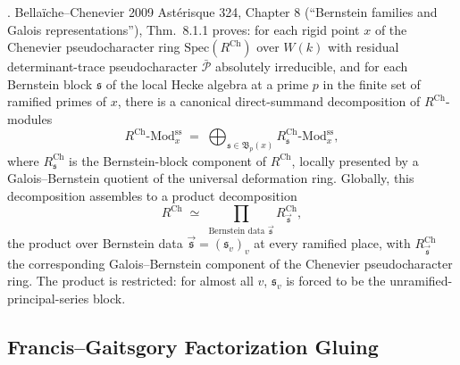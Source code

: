 \begin{theorem}
\label{v4-arith:w6-g:thm:bc-bernstein-galois}
\ClaimStatusProvedElsewhere. Bella\"iche--Chenevier 2009 Ast\'erisque
324, Chapter 8 (``Bernstein families and Galois
representations''), Thm.~8.1.1 proves: for each rigid point \(x\) of
the Chenevier pseudocharacter ring
\(\mathrm{Spec}(R^{\mathrm{Ch}})\) over \(W(k)\) with residual
determinant-trace pseudocharacter \(\bar{\mathcal{P}}\) absolutely
irreducible, and for each Bernstein block \(\mathfrak{s}\) of the
local Hecke algebra at a prime \(p\) in the finite set of ramified
primes of \(x\), there is a canonical direct-summand decomposition of
\(R^{\mathrm{Ch}}\)-modules
\begin{equation}
\label{v4-arith:w6-g:eq:bc-bernstein-galois}
R^{\mathrm{Ch}}\text{-}\mathrm{Mod}^{\mathrm{ss}}_{x}\;=\;\bigoplus_{\mathfrak{s}\in\mathfrak{B}_{p}(x)}R^{\mathrm{Ch}}_{\mathfrak{s}}\text{-}\mathrm{Mod}^{\mathrm{ss}}_{x},
\end{equation}
where \(R^{\mathrm{Ch}}_{\mathfrak{s}}\) is the Bernstein-block
component of \(R^{\mathrm{Ch}}\), locally presented by a
Galois--Bernstein quotient of the universal deformation ring.
Globally, this decomposition assembles to a product decomposition
\begin{equation}
\label{v4-arith:w6-g:eq:bc-global-bernstein-galois}
R^{\mathrm{Ch}}\;\simeq\;\prod_{\text{Bernstein data }\vec{\mathfrak{s}}}R^{\mathrm{Ch}}_{\vec{\mathfrak{s}}},
\end{equation}
the product over Bernstein data
\(\vec{\mathfrak{s}}=(\mathfrak{s}_{v})_{v}\) at every ramified place,
with \(R^{\mathrm{Ch}}_{\vec{\mathfrak{s}}}\) the corresponding
Galois--Bernstein component of the Chenevier pseudocharacter ring.
The product is restricted: for almost all \(v\), \(\mathfrak{s}_{v}\)
is forced to be the unramified-principal-series block.
\end{theorem}

\subsection{Francis--Gaitsgory Factorization Gluing}

